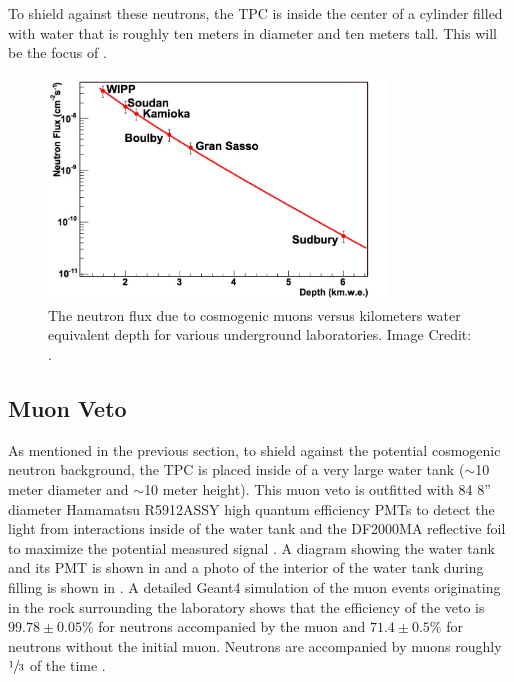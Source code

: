  To shield against these neutrons, the TPC is inside the center of a cylinder filled with water that is roughly ten meters in diameter and ten meters tall.  This will be the focus of . 
 
\begin{figure}[t]
	\centering
	\includegraphics[width=0.8\textwidth]{neutron_flux}
	\caption{The neutron flux due to cosmogenic muons versus kilometers water equivalent depth for various underground laboratories.    Image Credit: .}
	\label{fig:neutron_flux}
\end{figure}
 
 
 \subsection{Muon Veto}
 \label{sec:muon_veto}
 
 As mentioned in the previous section, to shield against the potential cosmogenic neutron background, the TPC is placed inside of a very large water tank ($\sim$10 meter diameter and $\sim$10 meter height).  This muon veto is outfitted with 84 8'' diameter Hamamatsu R5912ASSY high quantum efficiency PMTs to detect the light from interactions inside of the water tank and the DF2000MA reflective foil to maximize the potential measured signal \cite{aprile2014conceptual}.  A diagram showing the water tank and its PMT is shown in  and a photo of the interior of the water tank during filling is shown in .  A detailed Geant4 simulation \cite{agostinelli2003geant4} of the muon events originating in the rock surrounding the laboratory shows that the efficiency of the veto is $99.78 \pm 0.05 \%$ for neutrons accompanied by the muon and $71.4 \pm 0.5 \%$ for neutrons without the initial muon.  Neutrons are accompanied by muons roughly $\sfrac{1}{3}$ of the time \cite{aprile2014conceptual}.  
 
